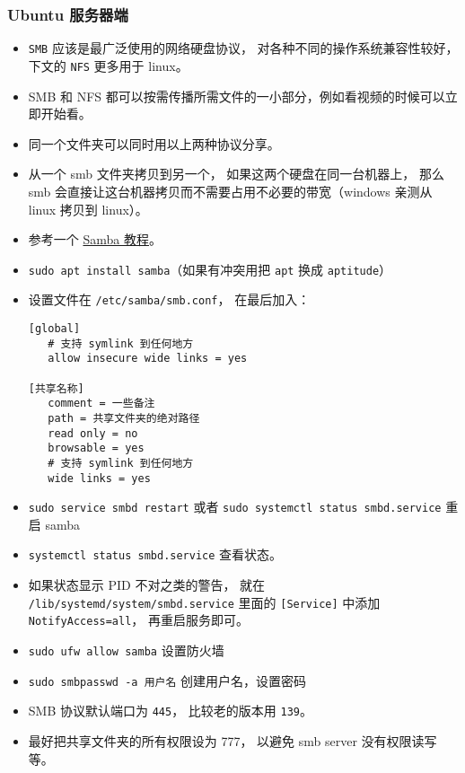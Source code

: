 \subsubsection{Ubuntu 服务器端}
\begin{itemize}
\item \verb`SMB` 应该是最广泛使用的网络硬盘协议， 对各种不同的操作系统兼容性较好， 下文的 \verb`NFS` 更多用于 linux。
\item SMB 和 NFS 都可以按需传播所需文件的一小部分，例如看视频的时候可以立即开始看。
\item 同一个文件夹可以同时用以上两种协议分享。
\item 从一个 smb 文件夹拷贝到另一个， 如果这两个硬盘在同一台机器上， 那么 smb 会直接让这台机器拷贝而不需要占用不必要的带宽（windows 亲测从 linux 拷贝到 linux）。
\item 参考一个 \href{https://ubuntu.com/tutorials/install-and-configure-samba}{Samba 教程}。
\item \verb`sudo apt install samba`（如果有冲突用把 \verb`apt` 换成 \verb`aptitude`）
\item 设置文件在 \verb`/etc/samba/smb.conf`， 在最后加入：
\begin{lstlisting}[language=none]
[global]
   # 支持 symlink 到任何地方
   allow insecure wide links = yes

[共享名称]
   comment = 一些备注
   path = 共享文件夹的绝对路径
   read only = no
   browsable = yes
   # 支持 symlink 到任何地方
   wide links = yes
\end{lstlisting}
\item \verb`sudo service smbd restart` 或者 \verb`sudo systemctl status smbd.service` 重启 samba
\item \verb`systemctl status smbd.service` 查看状态。
\item 如果状态显示 PID 不对之类的警告， 就在 \verb`/lib/systemd/system/smbd.service` 里面的 \verb`[Service]` 中添加 \verb`NotifyAccess=all`， 再重启服务即可。
\item \verb`sudo ufw allow samba` 设置防火墙
\item \verb`sudo smbpasswd -a 用户名` 创建用户名，设置密码
\item SMB 协议默认端口为 \verb`445`， 比较老的版本用 \verb`139`。
\item 最好把共享文件夹的所有权限设为 777， 以避免 smb server 没有权限读写等。
\end{itemize}

